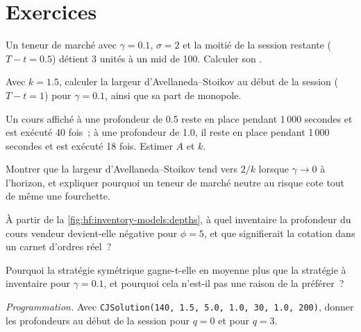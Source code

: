\section{Exercices}

\begin{exercise}[$\star$]\label{exo:hf:inventory-models:1}
Un teneur de marché avec $\gamma=0.1$, $\sigma=2$ et la moitié de la session restante ($T-t=0.5$) détient 3 unités à un mid de 100. Calculer son .
\end{exercise}

\begin{exercise}[$\star$]\label{exo:hf:inventory-models:2}
Avec $k=1.5$, calculer la largeur d'Avellaneda--Stoikov au début de la session ($T-t=1$) pour $\gamma=0.1$, ainsi que sa part de monopole.
\end{exercise}

\begin{exercise}[$\star$]\label{exo:hf:inventory-models:3}
Un cours affiché à une profondeur de 0.5 reste en place pendant 1\,000 secondes et est exécuté 40 fois~; à une profondeur de 1.0, il reste en place pendant 1\,000 secondes et est exécuté 18 fois. Estimer $A$ et $k$.
\end{exercise}

\begin{exercise}[$\star\star$]\label{exo:hf:inventory-models:4}
Montrer que la largeur d'Avellaneda--Stoikov tend vers $2/k$ lorsque $\gamma\to0$ à l'horizon, et expliquer pourquoi un teneur de marché neutre au risque cote
tout de même une fourchette.
\end{exercise}

\begin{exercise}[$\star\star$]\label{exo:hf:inventory-models:5}
À partir de la \cref{fig:hf:inventory-models:depths}, à quel inventaire la profondeur du cours vendeur devient-elle négative pour $\phi=5$, et que signifierait la cotation dans un
carnet d'ordres réel~?
\end{exercise}

\begin{exercise}[$\star\star$]\label{exo:hf:inventory-models:6}
Pourquoi la stratégie symétrique gagne-t-elle en moyenne plus que la stratégie à inventaire pour $\gamma=0.1$, et pourquoi cela n'est-il pas une raison de la préférer~?
\end{exercise}

\begin{exercise}[$\star\star\star$]\label{exo:hf:inventory-models:7}
\emph{Programmation.} Avec \texttt{CJSolution(140, 1.5, 5.0, 1.0, 30, 1.0, 200)}, donner les profondeurs au début de la session pour $q=0$ et pour $q=3$.
\end{exercise}

